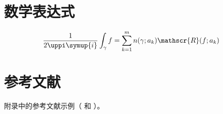 \section{数学表达式}

\begin{equation}
  \frac{1}{2 \uppi \symup{i}} \int_\gamma f = \sum_{k=1}^m n(\gamma; a_k) \mathscr{R}(f; a_k)
  \label{eq:appendix-equation}
\end{equation}


\section{参考文献}

附录中的参考文献示例（\cite{carlson1981two} 和 \cite{carlson1981two,taylor1983scanning,taylor1981study}）。


